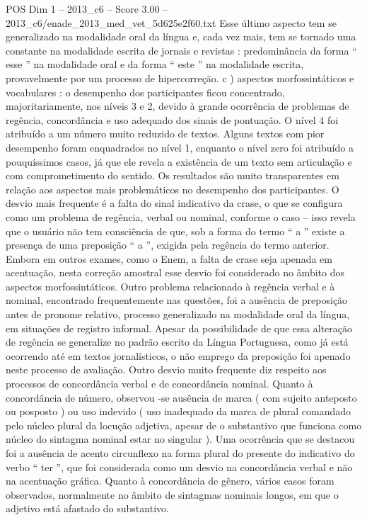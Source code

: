 \begin{textsample}{POS Dim 1 – 2013\_c6 – Score 3.00 – 2013\_c6/enade\_2013\_med\_vet\_5d625e2f60.txt}
Esse último aspecto tem se generalizado na modalidade oral da língua e, cada vez mais, tem se tornado uma constante na modalidade escrita de jornais e revistas : predominância da forma “ esse ” na modalidade oral e da forma “ este ” na modalidade escrita, provavelmente por um processo de hipercorreção. c ) aspectos morfossintáticos e vocabulares : o desempenho dos participantes ficou concentrado, majoritariamente, nos níveis 3 e 2, devido à grande ocorrência de problemas de regência, concordância e uso adequado dos sinais de pontuação.
O nível 4 foi atribuído a um número muito reduzido de textos.
Alguns textos com pior desempenho foram enquadrados no nível 1, enquanto o nível zero foi atribuído a pouquíssimos casos, já que ele revela a existência de um texto sem articulação e com comprometimento do sentido.
Os resultados são muito transparentes em relação aos aspectos mais problemáticos no desempenho dos participantes.
O desvio mais frequente é a falta do sinal indicativo da crase, o que se configura como um problema de regência, verbal ou nominal, conforme o caso – isso revela que o usuário não tem consciência de que, sob a forma do termo “ a ” existe a presença de uma preposição “ a ”, exigida pela regência do termo anterior.
Embora em outros exames, como o Enem, a falta de crase seja apenada em acentuação, nesta correção amostral esse desvio foi considerado no âmbito dos aspectos morfossintáticos.
Outro problema relacionado à regência verbal e à nominal, encontrado frequentemente nas questões, foi a ausência de preposição antes de pronome relativo, processo generalizado na modalidade oral da língua, em situações de registro informal.
Apesar da possibilidade de que essa alteração de regência se generalize no padrão escrito da Língua Portuguesa, como já está ocorrendo até em textos jornalísticos, o não emprego da preposição foi apenado neste processo de avaliação.
Outro desvio muito frequente diz respeito aos processos de concordância verbal e de concordância nominal.
Quanto à concordância de número, observou -se ausência de marca ( com sujeito anteposto ou posposto ) ou uso indevido ( uso inadequado da marca de plural comandado pelo núcleo plural da locução adjetiva, apesar de o substantivo que funciona como núcleo do sintagma nominal estar no singular ).
Uma ocorrência que se destacou foi a ausência de acento circunflexo na forma plural do presente do indicativo do verbo “ ter ”, que foi considerada como um desvio na concordância verbal e não na acentuação gráfica.
Quanto à concordância de gênero, vários casos foram observados, normalmente no âmbito de sintagmas nominais longos, em que o adjetivo está afastado do substantivo.

\end{textsample}
